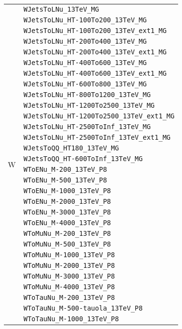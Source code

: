 \begin{longtable}{ll}
\midrule
\multirow{33}{*}{W} & \texttt{WJetsToLNu\_13TeV\_MG} \\
 & \texttt{WJetsToLNu\_HT-100To200\_13TeV\_MG} \\
 & \texttt{WJetsToLNu\_HT-100To200\_13TeV\_ext1\_MG} \\
 & \texttt{WJetsToLNu\_HT-200To400\_13TeV\_MG} \\
 & \texttt{WJetsToLNu\_HT-200To400\_13TeV\_ext1\_MG} \\
 & \texttt{WJetsToLNu\_HT-400To600\_13TeV\_MG} \\
 & \texttt{WJetsToLNu\_HT-400To600\_13TeV\_ext1\_MG} \\
 & \texttt{WJetsToLNu\_HT-600To800\_13TeV\_MG} \\
 & \texttt{WJetsToLNu\_HT-800To1200\_13TeV\_MG} \\
 & \texttt{WJetsToLNu\_HT-1200To2500\_13TeV\_MG} \\
 & \texttt{WJetsToLNu\_HT-1200To2500\_13TeV\_ext1\_MG} \\
 & \texttt{WJetsToLNu\_HT-2500ToInf\_13TeV\_MG} \\
 & \texttt{WJetsToLNu\_HT-2500ToInf\_13TeV\_ext1\_MG} \\
 & \texttt{WJetsToQQ\_HT180\_13TeV\_MG} \\
 & \texttt{WJetsToQQ\_HT-600ToInf\_13TeV\_MG} \\
 & \texttt{WToENu\_M-200\_13TeV\_P8} \\
 & \texttt{WToENu\_M-500\_13TeV\_P8} \\
 & \texttt{WToENu\_M-1000\_13TeV\_P8} \\
 & \texttt{WToENu\_M-2000\_13TeV\_P8} \\
 & \texttt{WToENu\_M-3000\_13TeV\_P8} \\
 & \texttt{WToENu\_M-4000\_13TeV\_P8} \\
 & \texttt{WToMuNu\_M-200\_13TeV\_P8} \\
 & \texttt{WToMuNu\_M-500\_13TeV\_P8} \\
 & \texttt{WToMuNu\_M-1000\_13TeV\_P8} \\
 & \texttt{WToMuNu\_M-2000\_13TeV\_P8} \\
 & \texttt{WToMuNu\_M-3000\_13TeV\_P8} \\
 & \texttt{WToMuNu\_M-4000\_13TeV\_P8} \\
 & \texttt{WToTauNu\_M-200\_13TeV\_P8} \\
 & \texttt{WToTauNu\_M-500-tauola\_13TeV\_P8} \\
 & \texttt{WToTauNu\_M-1000\_13TeV\_P8} \\

\end{longtable}

